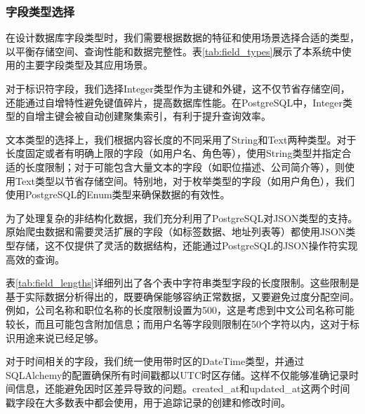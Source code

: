 \subsubsection{字段类型选择}

在设计数据库字段类型时，我们需要根据数据的特征和使用场景选择合适的类型，以平衡存储空间、查询性能和数据完整性。表\ref{tab:field_types}展示了本系统中使用的主要字段类型及其应用场景。

对于标识符字段，我们选择Integer类型作为主键和外键，这不仅节省存储空间，还能通过自增特性避免键值碎片，提高数据库性能。在PostgreSQL中，Integer类型的自增主键会被自动创建聚集索引，有利于提升查询效率。

文本类型的选择上，我们根据内容长度的不同采用了String和Text两种类型。对于长度固定或者有明确上限的字段（如用户名、角色等），使用String类型并指定合适的长度限制；对于可能包含大量文本的字段（如职位描述、公司简介等），则使用Text类型以节省存储空间。特别地，对于枚举类型的字段（如用户角色），我们使用PostgreSQL的Enum类型来确保数据的有效性。

为了处理复杂的非结构化数据，我们充分利用了PostgreSQL对JSON类型的支持。原始爬虫数据和需要灵活扩展的字段（如标签数据、地址列表等）都使用JSON类型存储，这不仅提供了灵活的数据结构，还能通过PostgreSQL的JSON操作符实现高效的查询。

表\ref{tab:field_lengths}详细列出了各个表中字符串类型字段的长度限制。这些限制是基于实际数据分析得出的，既要确保能够容纳正常数据，又要避免过度分配空间。例如，公司名称和职位名称的长度限制设置为500，这是考虑到中文公司名称可能较长，而且可能包含附加信息；而用户名等字段则限制在50个字符以内，这对于标识用途来说已经足够。

对于时间相关的字段，我们统一使用带时区的DateTime类型，并通过SQLAlchemy的配置确保所有时间戳都以UTC时区存储。这样不仅能够准确记录时间信息，还能避免因时区差异导致的问题。created\_at和updated\_at这两个时间戳字段在大多数表中都会使用，用于追踪记录的创建和修改时间。

